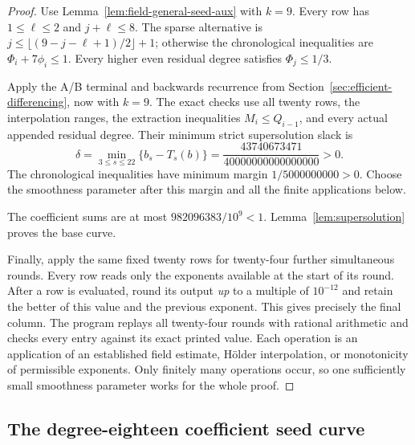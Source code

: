 \documentclass[11pt]{amsart}
\theoremstyle{definition}
\numberwithin{equation}{section}
\begin{document}
\begin{proof}
Use Lemma~\ref{lem:field-general-seed-aux} with $k=9$.
Every row has $1\le\ell\le2$ and $j+\ell\le8$.
The sparse alternative is $j\le\lfloor(9-j-\ell+1)/2\rfloor+1$;
otherwise the chronological inequalities are $\Phi_i+7\phi_i\le1$.
Every higher even residual degree satisfies $\Phi_j\le1/3$.

Apply the A/B terminal and backwards recurrence from
Section~\ref{sec:efficient-differencing}, now with $k=9$.
The exact checks use all twenty rows, the interpolation ranges, the
extraction inequalities $M_i\le Q_{i-1}$, and every actual appended
residual degree.  Their minimum strict supersolution slack is
\[
 \delta=\min_{3\le s\le22}\{b_s-T_s(b)\}
       =\frac{43740673471}{40000000000000000}>0.
\]
The chronological inequalities have minimum margin
$1/5000000000>0$. Choose the smoothness parameter after this margin and
all the finite applications below.

The coefficient sums are at most $982096383/10^9<1$.
Lemma~\ref{lem:supersolution} proves the base curve.

Finally, apply the same fixed twenty rows for twenty-four further
simultaneous rounds.  Every row reads only the exponents available at
the start of its round.  After a row is evaluated, round its output
\emph{up} to a multiple of $10^{-12}$ and retain the better of this value
and the previous exponent.  This gives precisely the final column.
The program replays all twenty-four rounds with rational
arithmetic and checks every entry against its exact printed value.
Each operation is an application of an established field estimate,
H\"older interpolation, or monotonicity of permissible exponents.
Only finitely many operations occur, so one sufficiently small
smoothness parameter works for the whole proof.
\end{proof}

\subsection{The degree-eighteen coefficient seed curve}
\label{sec:degree18-field-seeds}
\end{document}
